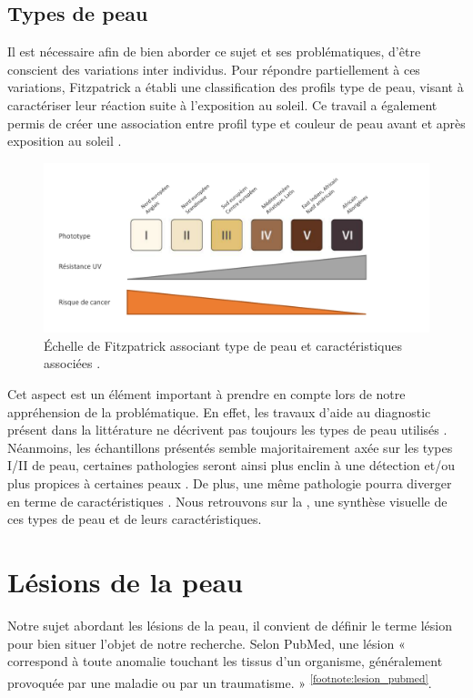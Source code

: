 \subsection{Types de peau}
Il est nécessaire afin de bien aborder ce sujet et ses problématiques, d’être conscient des variations inter individus. Pour répondre partiellement à ces variations, Fitzpatrick a établi une classification des profils type de peau, visant à caractériser leur réaction suite à l’exposition au soleil. Ce travail a également permis de créer une association entre profil type et couleur de peau avant et après exposition au soleil \cite{Fitzpatrick1988}. 
\begin{figure}[H]
    \centering
    \includegraphics[width=\linewidth]{contents/chapter_1/resources/scheme_fitzpatrick_scale.pdf}
    \caption{Échelle de Fitzpatrick associant type de peau et caractéristiques associées \cite{Fitzpatrick1988}.}
    \label{fig:scheme_fitzpatrick_scale}
\end{figure}
Cet aspect est un élément important à prendre en compte lors de notre appréhension de la problématique. En effet, les travaux d'aide au diagnostic présent dans la littérature ne décrivent pas toujours les types de peau utilisés \cite{Celebi2007,Wiltgen2008,Koller2011}. Néanmoins, les échantillons présentés semble majoritairement axée sur les types I/II de peau, certaines pathologies seront ainsi plus enclin à une détection et/ou plus propices à certaines peaux \cite{Narayanan2010}. De plus, une même pathologie pourra diverger en terme de caractéristiques \cite{Tuma2015}. Nous retrouvons sur la , une synthèse visuelle de ces types de peau et de leurs caractéristiques.

\section{Lésions de la peau}
Notre sujet abordant les lésions de la peau, il convient de définir le terme lésion pour bien situer l’objet de notre recherche. Selon PubMed, une lésion « correspond à toute anomalie touchant les tissus d’un organisme, généralement provoquée par une maladie ou par un traumatisme. » \textsuperscript{\ref{footnote:lesion_pubmed}}.\par
\addtocounter{footnote}{1}

